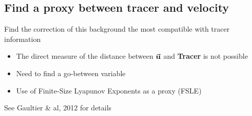 \documentclass[compress,slidescentered,notes=show]{beamer}
\begin{document}
	\subsection[proxy FSLE]{Find a proxy between tracer and velocity}
\begin{frame}
  \vspace{0.6cm}
  \begin{block}{Find the correction of this background the most compatible with tracer information}
    \begin{itemize}
     \item The direct measure of the distance between $\vec{\bf{u}}$ and \textbf{Tracer} is not possible
     \item Need to find a go-between variable
     \item Use of Finite-Size Lyapunov Exponents as a proxy (FSLE)
    \end{itemize}
  \end{block}
    \small{See Gaultier \& al, 2012 for details}
\end{frame}

\begin{frame}

\end{frame}
\end{document}
